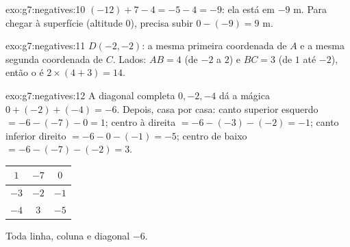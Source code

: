 \begin{solution}{exo:g7:negatives:10}
$(-12) + 7 - 4 = -5 - 4 = -9$: ela está em $-9$ m. Para chegar à
superfície (altitude $0$), precisa subir $0 - (-9) = 9$ m.
\end{solution}

\begin{solution}{exo:g7:negatives:11}
$D(-2, -2)$: a mesma primeira coordenada de $A$ e a mesma segunda
coordenada de $C$. Lados: $AB = 4$ (de $-2$ a $2$) e $BC = 3$ (de $1$
até $-2$), então o  é $2 \times (4 + 3) = 14$.
\end{solution}

\begin{solution}{exo:g7:negatives:12}
A diagonal completa $0, -2, -4$ dá a  mágica
$0 + (-2) + (-4) = -6$. Depois, casa por casa: canto superior esquerdo
$= -6 - (-7) - 0 = 1$; centro à direita $= -6 - (-3) - (-2) = -1$;
canto inferior direito $= -6 - 0 - (-1) = -5$; centro de baixo
$= -6 - (-7) - (-2) = 3$.
\begin{center}
\renewcommand{\arraystretch}{1.4}
\begin{tabular}{|c|c|c|}
\hline
$1$ & $-7$ & $0$ \\
\hline
$-3$ & $-2$ & $-1$ \\
\hline
$-4$ & $3$ & $-5$ \\
\hline
\end{tabular}
\end{center}
Toda linha, coluna e diagonal  $-6$.
\end{solution}

